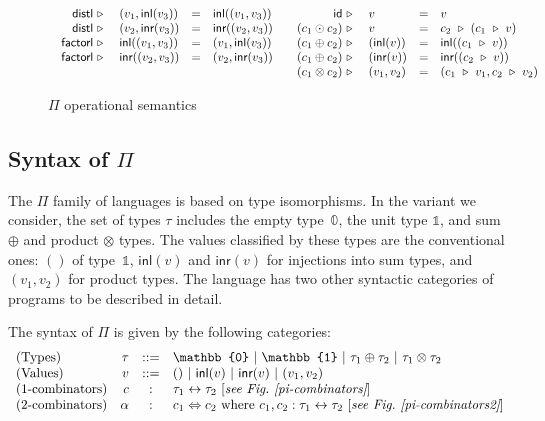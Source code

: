 \documentclass[a4paper,USenglish]{lipics-v2016-utf8x}
\newcommand{\iso}{\leftrightarrow}
\newcommand{\isotwo}{\Leftrightarrow}
\newcommand{\alt}{~|~}
\newcommand{\inl}[1]{\textsf{inl}(#1)}
\newcommand{\inr}[1]{\textsf{inr}(#1)}
\newcommand{\zt}{\mathbb{0}}
\newcommand{\ot}{\mathbb{1}}
\newcommand{\evalone}[2]{#1~\triangleright~#2}
\newcommand{\unitv}{()}
\newcommand{\distl}{\mathsf{{distl}}}
\newcommand{\factorl}{\mathsf{{factorl}}}
\newcommand{\idiso}{\mathsf{{id}}}
\begin{document}
\begin{figure}[t]
{\[\begin{array}{cc}
\begin{array}[t]{rlcl}
\evalone{\distl}{&(v_1,\inl{v_3})} &=& \inl{(v_1,v_3)} \\
\evalone{\distl}{&(v_2,\inr{v_3})} &=& \inr{(v_2,v_3)} \\
\evalone{\factorl}{&\inl{(v_1,v_3)}} &=& (v_1,\inl{v_3}) \\
\evalone{\factorl}{&\inr{(v_2,v_3)}} &=& (v_2,\inr{v_3})
\end{array} &
\begin{array}[t]{rlcl}
\evalone{\idiso}{&v} &=& v \\
\evalone{(c_1 \odot c_2)}{&v} &=&
  \evalone{c_2}{(\evalone{c_1}{v})} \\
\evalone{(c_1 \oplus c_2)}{&(\inl{v})} &=&
  \inl{(\evalone{c_1}{v})} \\
\evalone{(c_1 \oplus c_2)}{&(\inr{v})} &=&
  \inr{(\evalone{c_2}{v})} \\
\evalone{(c_1 \otimes c_2)}{&(v_1,v_2)} &=&
  (\evalone{c_1}v_1, \evalone{c_2}v_2)
\end{array}
\end{array}\]
\caption{\label{fig:opsem}$\Pi$ operational semantics}
}
\end{figure}

\subsection{Syntax of $\Pi$}
\label{opsempi}

The $\Pi$ family of languages is based on type isomorphisms. In the
variant we consider, the set of types $\tau$ includes the empty
type~$\zt$, the unit type $\ot$, and sum $\oplus$ and product
$\otimes$ types. The values classified by these types are the
conventional ones: $\unitv$ of type~$\ot$, $\inl{v}$ and $\inr{v}$ for
injections into sum types, and $(v_1,v_2)$ for product types. The
language has two other syntactic categories of programs to be
described in detail.

\begin{definition}[$\Pi$]
\label{def:pi}
The syntax of $\Pi$ is given by the following categories:
\[\begin{array}{lrcl}
(\textrm{Types}) &
  \tau &::=& \zt \alt \ot \alt \tau_1 \oplus \tau_2 \alt \tau_1 \otimes \tau_2 \\
(\textrm{Values}) &
  v &::=& \unitv \alt \inl{v} \alt \inr{v} \alt (v_1,v_2) \\
(\textrm{1-combinators}) &
  c &:& \tau_1 \iso \tau_2 ~ [\textit{see Fig.~\ref{pi-combinators}}] \\
(\textrm{2-combinators}) &
  \alpha &:& c_1 \isotwo c_2 \mbox{~where~} c_1, c_2 : \tau_1 \iso \tau_2
  ~[\textit{see Fig.~\ref{pi-combinators2}}]
\end{array}\]
\end{definition}
\end{document}
